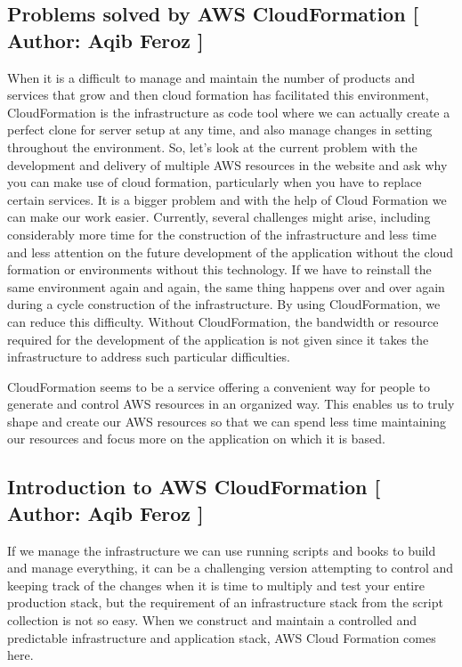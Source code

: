 \subsection{Problems solved by AWS CloudFormation [ Author: Aqib Feroz ]}
When it is a difficult to manage and maintain the number of products and services that grow and then cloud formation has facilitated this environment, CloudFormation is the infrastructure as code tool where we can actually create a perfect clone for server setup at any time, and also manage changes in setting throughout the environment. So, let's look at the current problem with the development and delivery of multiple AWS resources in the website and ask why you can make use of cloud formation, particularly when you have to replace certain services. It is a bigger problem and with the help of Cloud Formation we can make our work easier. Currently, several challenges might arise, including considerably more time for the construction of the infrastructure and less time and less attention on the future development of the application without the cloud formation or environments without this technology. If we have to reinstall the same environment again and again, the same thing happens over and over again during a cycle construction of the infrastructure. By using CloudFormation, we can reduce this difficulty. Without CloudFormation, the bandwidth or resource required for the development of the application is not given since it takes the infrastructure to address such particular difficulties.

CloudFormation seems to be a service offering a convenient way for people to generate and control AWS resources in an organized way. This enables us to truly shape and create our AWS resources so that we can spend less time maintaining our resources and focus more on the application on which it is based.


\subsection{Introduction to AWS CloudFormation [ Author: Aqib Feroz ]}

If we manage the infrastructure we can use running scripts and books to build and manage everything, it can be a challenging version attempting to control and keeping track of the changes when it is time to multiply and test your entire production stack, but the requirement of an infrastructure stack from the script collection is not so easy. When we construct and maintain a controlled and predictable infrastructure and application stack, AWS Cloud Formation comes here.

